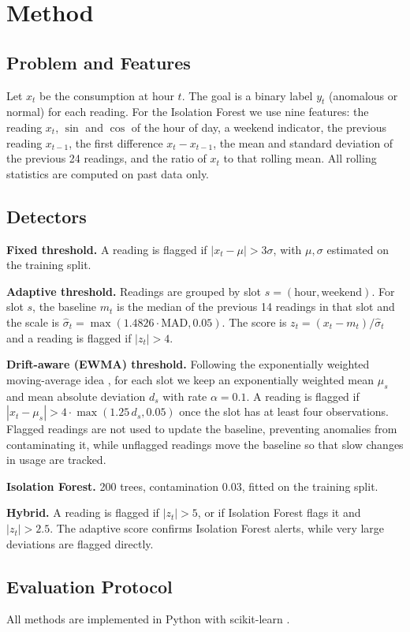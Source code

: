 \documentclass[conference]{IEEEtran}
\begin{document}
\section{Method}
\subsection{Problem and Features}
Let $x_t$ be the consumption at hour $t$. The goal is a binary label $y_t$ (anomalous or normal) for each reading. For the Isolation Forest we use nine features: the reading $x_t$, $\sin$ and $\cos$ of the hour of day, a weekend indicator, the previous reading $x_{t-1}$, the first difference $x_t - x_{t-1}$, the mean and standard deviation of the previous 24 readings, and the ratio of $x_t$ to that rolling mean. All rolling statistics are computed on past data only.

\subsection{Detectors}
\textbf{Fixed threshold.} A reading is flagged if $|x_t-\mu|>3\sigma$, with $\mu,\sigma$ estimated on the training split.

\textbf{Adaptive threshold.} Readings are grouped by slot $s=(\text{hour},\text{weekend})$. For slot $s$, the baseline $m_t$ is the median of the previous 14 readings in that slot and the scale is $\hat\sigma_t=\max(1.4826\cdot\text{MAD},0.05)$. The score is $z_t=(x_t-m_t)/\hat\sigma_t$ and a reading is flagged if $|z_t|>4$.

\textbf{Drift-aware (EWMA) threshold.} Following the exponentially weighted moving-average idea \cite{roberts1959}, for each slot we keep an exponentially weighted mean $\mu_s$ and mean absolute deviation $d_s$ with rate $\alpha=0.1$. A reading is flagged if $|x_t-\mu_s|>4\cdot\max(1.25\,d_s,0.05)$ once the slot has at least four observations. Flagged readings are not used to update the baseline, preventing anomalies from contaminating it, while unflagged readings move the baseline so that slow changes in usage are tracked.

\textbf{Isolation Forest.} 200 trees, contamination $0.03$, fitted on the training split.

\textbf{Hybrid.} A reading is flagged if $|z_t|>5$, or if Isolation Forest flags it and $|z_t|>2.5$. The adaptive score confirms Isolation Forest alerts, while very large deviations are flagged directly.

\subsection{Evaluation Protocol}
All methods are implemented in Python with scikit-learn \cite{pedregosa2011}.
\end{document}
